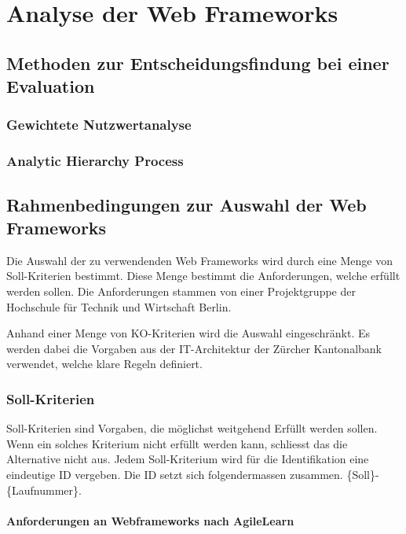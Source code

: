 \documentclass[
11pt, %
a4paper, %
BCOR25mm, %
DIV14, %
footsepline = false, %
headsepline, %
twoside, %
openright,
abstracton, %
listof=totocnumbered, %
bibliography=totocnumbered %
]{scrreprt}
\begin{document}
  \chapter{Analyse der Web Frameworks}
  
  \section{Methoden zur Entscheidungsfindung bei einer Evaluation}
  
  \subsection{Gewichtete Nutzwertanalyse}
    
  \subsection{Analytic Hierarchy Process}
    
  \section{Rahmenbedingungen zur Auswahl der Web Frameworks}
  
  Die Auswahl der zu verwendenden Web Frameworks wird durch eine Menge von
  Soll-Kriterien bestimmt. Diese Menge bestimmt die Anforderungen, welche
  erfüllt werden sollen. Die Anforderungen stammen von einer Projektgruppe der
  Hochschule für Technik und Wirtschaft Berlin.
  
  Anhand einer Menge von KO-Kriterien wird die Auswahl eingeschränkt. Es werden
  dabei die Vorgaben aus der IT-Architektur der Zürcher Kantonalbank verwendet,
  welche klare Regeln definiert.

  \subsection{Soll-Kriterien}
  
  Soll-Kriterien sind Vorgaben, die möglichst weitgehend Erfüllt werden sollen.
  Wenn ein solches Kriterium nicht erfüllt werden kann, schliesst das die
  Alternative nicht aus. Jedem Soll-Kriterium wird für die Identifikation eine
  eindeutige ID vergeben. Die ID setzt sich folgendermassen zusammen.
  \{Soll\}-\{Laufnummer\}.
  
  \subsubsection{Anforderungen an Webframeworks nach AgileLearn}
  
\end{document}
